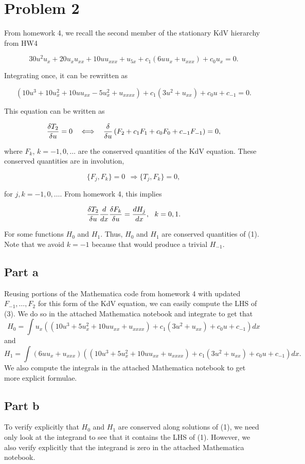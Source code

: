 \documentclass{article}
\newcommand{\beq}{\begin{equation}}
\newcommand{\eeq}{\end{equation}}
\newcommand{\DD}[2]{{\delta #1 \over \delta #2}}
\newcommand{\dd}[2]{{d #1 \over d #2}}
\begin{document}
\section{Problem 2}
From homework 4, we recall the second member of the stationary KdV hierarchy from HW4

\[
30u^2u_x+20u_x u_{xx}+10u u_{xxx}+u_{5x}+c_1(6uu_x+u_{xxx})+c_0 u_x=0.
\]

\noindent Integrating once, it can be rewritten as 

\beq
(10 u^3+10 u_x^2+10 u u_{xx}-5 u_x^2+u_{xxxx})+c_1(3 u^2+u_{xx})+c_0 u+c_{-1}=0. 
\eeq


This equation can be written as

\beq
\DD{T_2}{u}=0~~\iff~~\frac{\delta}{\delta u}\left(F_2+c_1 F_1+c_0 F_0+c_{-1} F_{-1}\right)=0,
\eeq

\noindent where $F_k$, $k=-1, 0, \ldots$ are the conserved quantities of the KdV equation. These conserved quantities are in involution, 

\[
\{F_j, F_k\}=0~~\Rightarrow \{T_j, F_k\}=0,  
\]

\noindent for $j,k=-1, 0, \ldots$. From homework 4, this implies

\beq
\DD{T_2}{u}\frac{d}{d x} \DD{F_k}{u}=\dd{H_j}{x}, ~~k=0,1.
\eeq    

\noindent For some functions $H_0$ and $H_1$. Thus, $H_0$ and $H_1$ are conserved quantities of (1). Note that we avoid $k=-1$ because that would produce a trivial $H_{-1}$.
\subsection{Part a}
Reusing portions of the Mathematica code from homework 4 with updated $F_{-1},\ldots,F_2$ for this form of the KdV equation, we can easily compute the LHS of (3). We do so in the attached Mathematica notebook and integrate to get that
\[
H_0=\int u_x\left((10 u^3+5 u_x^2+10 u u_{xx}+u_{xxxx})+c_1(3 u^2+u_{xx})+c_0 u+c_{-1}\right)dx
\]
and 
\[
H_1=\int (6uu_x+u_{xxx})\left((10 u^3+5 u_x^2+10 u u_{xx}+u_{xxxx})+c_1(3 u^2+u_{xx})+c_0 u+c_{-1}\right)dx.
\]
We also compute the integrals in the attached Mathematica notebook to get more explicit formulae.
\subsection{Part b}
To verify explicitly that $H_0$ and $H_1$ are conserved along solutions of (1), we need only look at the integrand to see that it contains the LHS of (1). However, we also verify explicitly that the integrand is zero in the attached Mathematica notebook.
\end{document}
